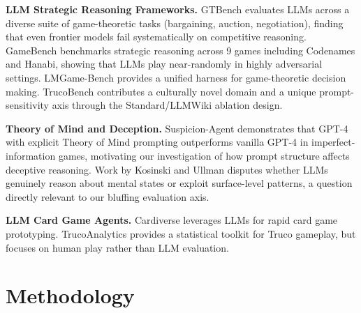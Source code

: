 \documentclass[11pt]{article}
\begin{document}
\textbf{LLM Strategic Reasoning Frameworks.}
GTBench \cite{duan2024gtbench} evaluates LLMs across a diverse suite of game-theoretic tasks (bargaining, auction, negotiation), finding that even frontier models fail systematically on competitive reasoning. GameBench \cite{costarelli2024gamebench} benchmarks strategic reasoning across 9 games including Codenames and Hanabi, showing that LLMs play near-randomly in highly adversarial settings. LMGame-Bench \cite{hu2025lmgamebench} provides a unified harness for game-theoretic decision making. TrucoBench contributes a culturally novel domain and a unique prompt-sensitivity axis through the Standard/LLMWiki ablation design.

\textbf{Theory of Mind and Deception.}
Suspicion-Agent \cite{guo2023suspicion} demonstrates that GPT-4 with explicit Theory of Mind prompting outperforms vanilla GPT-4 in imperfect-information games, motivating our investigation of how prompt structure affects deceptive reasoning. Work by Kosinski \cite{kosinski2023theory} and Ullman \cite{ullman2023large} disputes whether LLMs genuinely reason about mental states or exploit surface-level patterns, a question directly relevant to our bluffing evaluation axis.

\textbf{LLM Card Game Agents.}
Cardiverse \cite{cardiverse} leverages LLMs for rapid card game prototyping. TrucoAnalytics \cite{trucanalytics} provides a statistical toolkit for Truco gameplay, but focuses on human play rather than LLM evaluation.

\section{Methodology}
\end{document}
